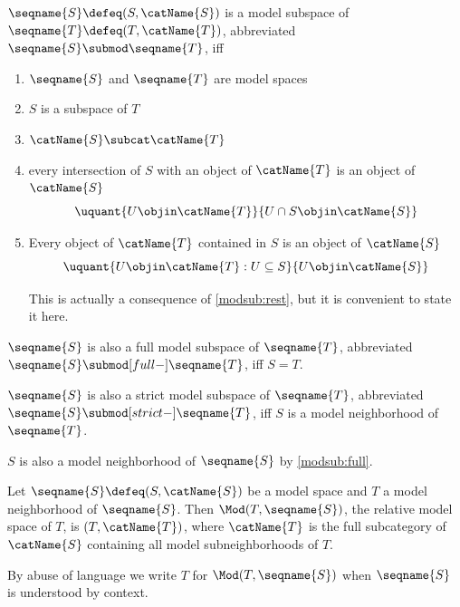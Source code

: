 \documentclass{article}
\begin{document}
\begin{definition}
\label{def:modsub}
$\seqname{S} \defeq (S, \catName{S})$ is a model subspace of
$\seqname{T} \defeq (T, \catName{T})$, abbreviated
$\seqname{S} \submod \seqname{T}$, iff

\begin{enumerate}
\item $\seqname{S}$ and $\seqname{T}$ are model spaces

\item $S$ is a subspace of $T$
\label{modsub:sub}

\item $\catName{S} \subcat \catName{T}$

\label{modsub:subcat}

\item every intersection of $S$ with an object of $\catName{T}$ is an object of $\catName{S}$
\label{modsub:rest}
\begin{equation}
\uquant%
  {U \objin \catName{T}}
  {U \cap S \objin \catName{S}}
\end{equation}

\item
\label{modsub:full}
Every object of $\catName{T}$ contained in $S$ is an object of
$\catName{S}$
\begin{equation}
\uquant%
  {U \objin \catName{T}: U \subseteq S}
  {U \objin \catName{S}}
\end{equation}

\begin{remark}
This is actually a consequence of \cref{modsub:rest}, but it is
convenient to state it here.
\end{remark}
\end{enumerate}

$\seqname{S}$ is also a full model subspace of $\seqname{T}$,
abbreviated $\seqname{S} \submod[full-] \seqname{T}$, iff
$S = T$.

$\seqname{S}$ is also a strict model subspace of $\seqname{T}$,
abbreviated $\seqname{S} \submod[strict-] \seqname{T}$, iff
$S$ is a model neighborhood of $\seqname{T}$.
\begin{remark}
$S$ is also a model neighborhood of $\seqname{S}$ by \cref{modsub:full}.
\end{remark}

Let $\seqname{S} \defeq (S, \catName{S})$ be a model space and $T$ a
model neighborhood of $\seqname{S}$. Then $\Mod(T,\seqname{S})$, the
relative model space of $T$, is $(T, \catName{T})$, where $\catName{T}$
is the full subcategory of $\catName{S}$ containing all model
subneighborhoods of $T$.

By abuse of language we write $T$ for $\Mod(T,\seqname{S})$ when
$\seqname{S}$ is understood by context.
\end{definition}
\end{document}
